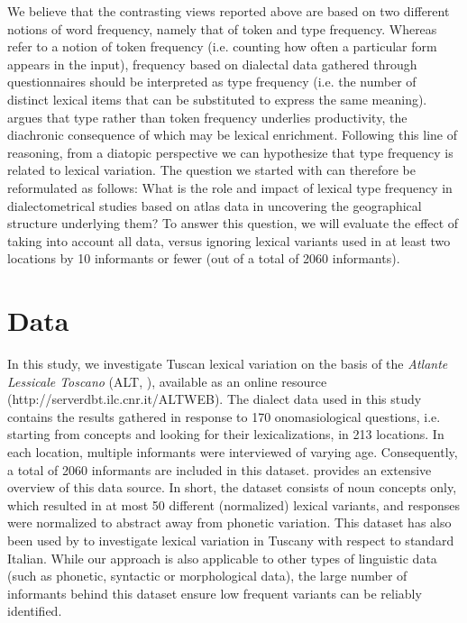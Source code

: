 \documentclass[output=paper]{LSP/langsci}
\begin{document}
We believe that the contrasting views reported above are based on two different notions of word frequency, namely that of token and type frequency. Whereas \citet{manning_foundations_1999} refer to a notion of token frequency (i.e. counting how often a particular form appears in the input), frequency based on dialectal data gathered through questionnaires should be interpreted as type frequency (i.e.  the number of distinct lexical items that can be substituted to express the same meaning). \citet{bybee_phonology_2001} argues that type rather than token frequency underlies productivity, the diachronic consequence of which may be lexical enrichment. Following this line of reasoning, from a diatopic perspective we can hypothesize that type frequency is related  to lexical variation. The question we started with can therefore be reformulated as follows: What is the role and impact of lexical type frequency in dialectometrical studies based on atlas data in uncovering the geographical structure underlying them? To answer this question, we will evaluate the effect of taking into account all data, versus ignoring lexical variants used in at least two locations by 10 informants or fewer (out of a total of 2060 informants).

\section{Data}
In this study, we investigate Tuscan lexical variation on the basis of the \textit{Atlante Lessicale Toscano} (ALT, \citealt{giacomelli_atlante_2000}), available as an online resource (http://serverdbt.ilc.cnr.it/ALTWEB). The dialect data used in this study contains the results gathered in response to 170 onomasiological questions, i.e. starting from concepts and looking for their lexicalizations, in 213 locations. In each location, multiple informants were interviewed of varying age. Consequently, a total of 2060 informants are included in this dataset. \citet{montemagni_tracking_2015} provides an extensive overview of this data source. In short, the dataset consists of noun concepts only, which resulted in at most 50 different (normalized) lexical variants, and responses were normalized to abstract away from phonetic variation. This dataset has also been used by \citet{wieling_lexical_2014} to investigate lexical variation in Tuscany with respect to standard Italian. While our approach is also applicable to other types of linguistic data (such as phonetic, syntactic or morphological data), the large number of informants behind this dataset ensure low frequent variants can be reliably identified.
\end{document}
